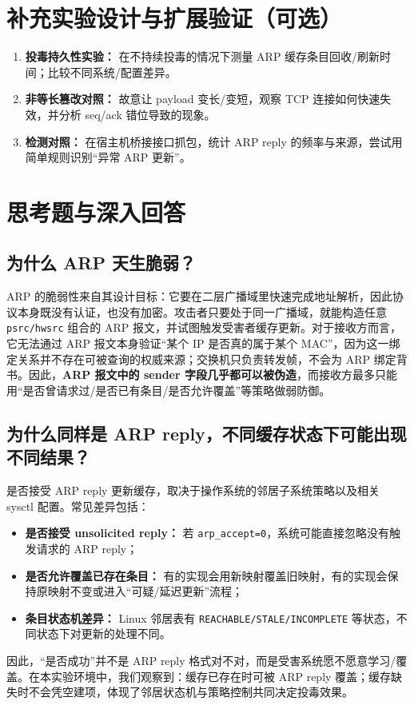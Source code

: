 \documentclass[12pt,hyperref,a4paper,UTF8,fontset=none]{ctexart}
\begin{document}
\section{补充实验设计与扩展验证（可选）}
\begin{enumerate}
    \item \textbf{投毒持久性实验：} 在不持续投毒的情况下测量 ARP 缓存条目回收/刷新时间；比较不同系统/配置差异。
    \item \textbf{非等长篡改对照：} 故意让 payload 变长/变短，观察 TCP 连接如何快速失效，并分析 seq/ack 错位导致的现象。
    \item \textbf{检测对照：} 在宿主机桥接接口抓包，统计 ARP reply 的频率与来源，尝试用简单规则识别“异常 ARP 更新”。
\end{enumerate}

\section{思考题与深入回答}

\subsection{为什么 ARP 天生脆弱？}
ARP 的脆弱性来自其设计目标：它要在二层广播域里快速完成地址解析，因此协议本身既没有认证，也没有加密。攻击者只要处于同一广播域，就能构造任意 \texttt{psrc/hwsrc} 组合的 ARP 报文，并试图触发受害者缓存更新。对于接收方而言，它无法通过 ARP 报文本身验证“某个 IP 是否真的属于某个 MAC”，因为这一绑定关系并不存在可被查询的权威来源；交换机只负责转发帧，不会为 ARP 绑定背书。因此，\textbf{ARP 报文中的 sender 字段几乎都可以被伪造}，而接收方最多只能用“是否曾请求过/是否已有条目/是否允许覆盖”等策略做弱防御。

\subsection{为什么同样是 ARP reply，不同缓存状态下可能出现不同结果？}
是否接受 ARP reply 更新缓存，取决于操作系统的邻居子系统策略以及相关 sysctl 配置。常见差异包括：
\begin{itemize}
    \item \textbf{是否接受 unsolicited reply：} 若 \texttt{arp\_accept=0}，系统可能直接忽略没有触发请求的 ARP reply；
    \item \textbf{是否允许覆盖已存在条目：} 有的实现会用新映射覆盖旧映射，有的实现会保持原映射不变或进入“可疑/延迟更新”流程；
    \item \textbf{条目状态机差异：} Linux 邻居表有 \texttt{REACHABLE/STALE/INCOMPLETE} 等状态，不同状态下对更新的处理不同。
\end{itemize}
因此，“是否成功”并不是 ARP reply 格式对不对，而是受害系统愿不愿意学习/覆盖。在本实验环境中，我们观察到：缓存已存在时可被 ARP reply 覆盖；缓存缺失时不会凭空建项，体现了邻居状态机与策略控制共同决定投毒效果。
\end{document}
